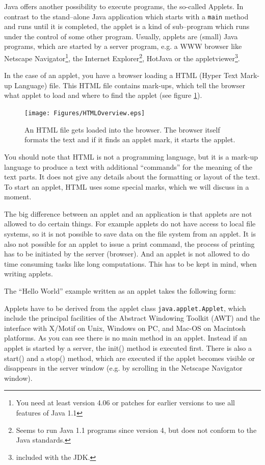 Java offers another possibility to execute programs, the so-called Applets.
In contrast to the stand--alone Java application which starts with a
\verb!main! method and runs until it is completed, the applet is a kind of
sub--program which runs under the control of some other program.
Usually, applets are (small) Java programs, which are started by a 
server program,
e.g. a WWW browser like Netscape Navigator\footnote{You need at least 
version 4.06 or patches for earlier versions to use all features of Java 1.1}, 
the Internet Explorer\footnote{Seems to run Java 1.1 programs since
version 4, but does not conform to the Java standards.},
HotJava or the appletviewer\footnote{included with the JDK.}.

In the case of an applet, you have a browser loading a HTML 
(Hyper Text Mark-up Language) file. This HTML file contains
mark-ups, which tell the browser what applet to load and
where to find the applet (see figure \ref{fig:HTMLOverview}). 
\begin{figure}[htbp]
  \begin{center}
    \texttt{[image: Figures/HTMLOverview.eps]}
    \caption{An HTML file gets loaded into the browser. The browser itself formats the text and if it finds an applet mark, it starts the applet.}
    \label{fig:HTMLOverview}
  \end{center}
\end{figure}
You should note that HTML is not a programming language, but
it is a mark-up language to produce a text with additional
``commands'' for the meaning of the text parts. It does
not give any details about the formatting or layout of the
text. To start an applet, HTML uses some special marks, which we
will discuss in a moment.  

The big difference between an applet and an application is that
applets are not allowed to do certain things. For example applets
do not have access to local file systems, so it is not possible
to save data on the file system from an applet. It is also not
possible for an applet to issue a print command, the process of
printing has to be initiated by the server (browser). 
And an applet is not allowed to do time consuming tasks like
long computations. This has to be kept in mind, when writing
applets.


The ``Hello World'' example written as an applet takes the following form:

Applets have to be derived from the applet class
\verb|java.applet.Applet|, which include the principal facilities of
the Abstract Windowing Toolkit (AWT) and the interface with X/Motif on
Unix, Windows on PC, and Mac-OS on Macintosh platforms.
As you can see there is no main method in an applet. Instead if an applet
is started by a server, the init() method is executed first. There is also
a start() and a stop() method, which are executed if the applet becomes
visible or disappears in the server window (e.g. by scrolling in the
Netscape Navigator window).


